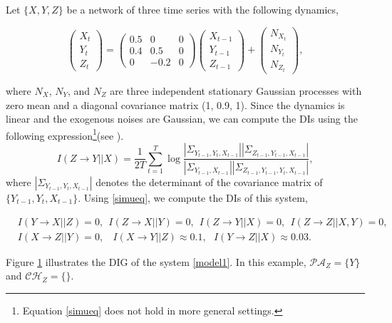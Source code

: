 \begin{example}\label{r1}
Let $\{X,Y,Z\}$ be a network of three time series with the following dynamics,
\begin{small}
\begin{equation}\label{model1}
\begin{pmatrix}
X_t \\
Y_t\\
Z_t
\end{pmatrix}=\begin{pmatrix}
0.5 & 0& 0\\
0.4 & 0.5 & 0\\
0 & -0.2 & 0
\end{pmatrix}\begin{pmatrix}
X_{t-1} \\
Y_{t-1}\\
Z_{t-1}
\end{pmatrix}+\begin{pmatrix}
N_{X_t} \\
N_{Y_t}\\
N_{Z_t}
\end{pmatrix},
\end{equation}
\end{small}
where $N_X$, $N_Y$, and $N_Z$ are three independent stationary Gaussian processes with zero mean and a diagonal covariance matrix (1, 0.9, 1). 
Since the dynamics is linear and the exogenous noises are Gaussian, we can compute the DIs using the following expression\footnote{Equation \eqref{simueq} does not hold in more general settings.}(see \citet{acc2014}).
\begin{equation}\label{simueq}
I(Z\rightarrow Y||X)=\frac{1}{2T}\sum_{t=1}^{T}\log\frac{|\Sigma_{Y_{t-1},Y_{t},X_{t-1}}||\Sigma_{Z_{t-1},Y_{t-1},X_{t-1}}|}{|\Sigma_{Y_{t-1},X_{t-1}}||\Sigma_{Z_{t-1},Y_{t-1},Y_{t},X_{t-1}}|},
\end{equation}
where $|\Sigma_{Y_{t-1},Y_{t},X_{t-1}}|$ denotes the determinant of the covariance matrix of $\{Y_{t-1},Y_{t},X_{t-1}\}$. Using \eqref{simueq}, we compute the DIs of this system,
\begin{small}
\begin{align}  \label{di_xyz}
&I(Y\rightarrow X||Z)=0,\ \ I(Z\rightarrow X||Y)=0,\ \ I(Z\rightarrow Y||X)=0,\ \ I(Z\rightarrow Z||X,Y)=0,\\
&I(X\rightarrow Z||Y)=0,\ \ \ \ I(X\rightarrow Y||Z)\approx 0.1, \ \ \ I(Y\rightarrow Z||X)\approx 0.03. \nonumber
\end{align}
\end{small}
Figure \ref{fig:example_dig} illustrates the DIG of the system \eqref{model1}. In this example, $\mathcal{PA}_Z=\{Y\}$ and $\mathcal{CH}_Z=\{\}$.
\begin{figure}[h]
\hspace{4cm}
\label{fig:example_dig}
\end{figure}
\end{example}


